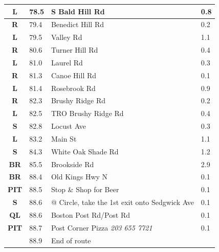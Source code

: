 \documentclass[11pt]{article}
\begin{document}
\begin{center}
\begin{supertabular}{|c|p{0.30in}|p{2.25in}|l|}
 \textbf{L} &  78.5 & S Bald Hill Rd &   0.8 \\ \hline
{} \textbf{R} &  79.4 & Benedict Hill Rd &   0.2 \\ \hline
 \textbf{L} &  79.5 & Valley Rd &   1.1 \\ \hline
{} \textbf{R} &  80.6 & Turner Hill Rd &   0.4 \\ \hline
 \textbf{L} &  81.0 & Laurel Rd &   0.3 \\ \hline
{} \textbf{R} &  81.3 & Canoe Hill Rd &   0.1 \\ \hline
 \textbf{L} &  81.4 & Rosebrook Rd &   0.9 \\ \hline
{} \textbf{R} &  82.3 & Brushy Ridge Rd &   0.2 \\ \hline
 \textbf{L} &  82.5 & TRO Brushy Ridge Rd &   0.4 \\ \hline
 \textbf{S} &  82.8 & Locust Ave &   0.3 \\ \hline
 \textbf{L} &  83.2 & Main St &   1.1 \\ \hline
 \textbf{S} &  84.3 & White Oak Shade Rd &   1.2 \\ \hline
{} \textbf{BR} &  85.5 & Brookside Rd &   2.9 \\ \hline
{} \textbf{BR} &  88.4 & Old Kings Hwy N &   0.1 \\ \hline
{} \textbf{PIT} &  88.5 & Stop \& Shop for Beer &   0.1 \\ \hline
 \textbf{S} &  88.6 & @ Circle, take the 1st exit onto Sedgwick Ave &   0.1 \\ \hline
 \textbf{QL} &  88.6 & Boston Post Rd/\hspace{0pt}Post Rd &   0.1 \\ \hline
{} \textbf{PIT} &  88.7 & Post Corner Pizza \newline \textit{203 655 7721} &   0.1 \\ \hline
{} \textbf{} &  88.9 & End of route &  \\ \hline

\end{supertabular}
\end{center}
\end{document}
